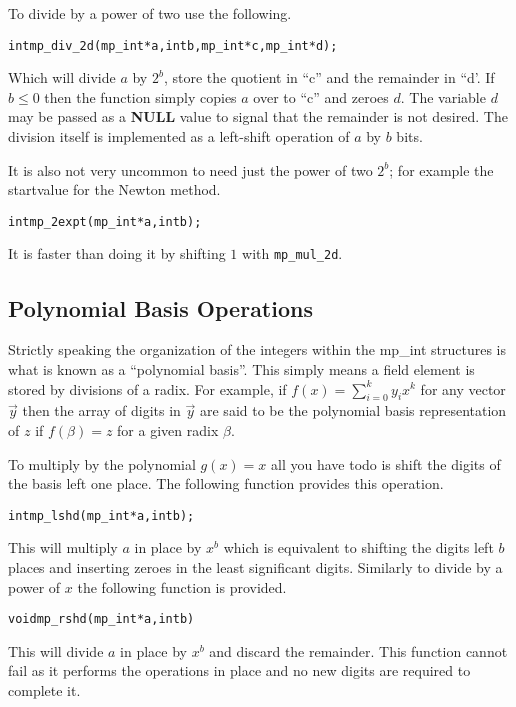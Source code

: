 \documentclass[synpaper]{book}
\begin{document}
To divide by a power of two use the following.

\begin{alltt}
int mp_div_2d (mp_int * a, int b, mp_int * c, mp_int * d);
\end{alltt}
Which will divide $a$ by $2^b$, store the quotient in ``c'' and the remainder in ``d'.  If $b \le 0$ then the
function simply copies $a$ over to ``c'' and zeroes $d$.  The variable $d$ may be passed as a \textbf{NULL}
value to signal that the remainder is not desired.  The division itself is implemented as a left-shift
operation of $a$ by $b$ bits.

It is also not very uncommon to need just the power of two $2^b$;  for example the startvalue for the Newton method.

\begin{alltt}
int mp_2expt(mp_int *a, int b);
\end{alltt}
It is faster than doing it by shifting $1$ with \texttt{mp\_mul\_2d}.

\subsection{Polynomial Basis Operations}

Strictly speaking the organization of the integers within the mp\_int structures is what is known as a
``polynomial basis''.  This simply means a field element is stored by divisions of a radix.  For example, if
$f(x) = \sum_{i=0}^{k} y_ix^k$ for any vector $\vec y$ then the array of digits in $\vec y$ are said to be
the polynomial basis representation of $z$ if $f(\beta) = z$ for a given radix $\beta$.

To multiply by the polynomial $g(x) = x$ all you have todo is shift the digits of the basis left one place.  The
following function provides this operation.

\begin{alltt}
int mp_lshd (mp_int * a, int b);
\end{alltt}

This will multiply $a$ in place by $x^b$ which is equivalent to shifting the digits left $b$ places and inserting zeroes
in the least significant digits.  Similarly to divide by a power of $x$ the following function is provided.

\begin{alltt}
void mp_rshd (mp_int * a, int b)
\end{alltt}
This will divide $a$ in place by $x^b$ and discard the remainder.  This function cannot fail as it performs the operations
in place and no new digits are required to complete it.
\end{document}
